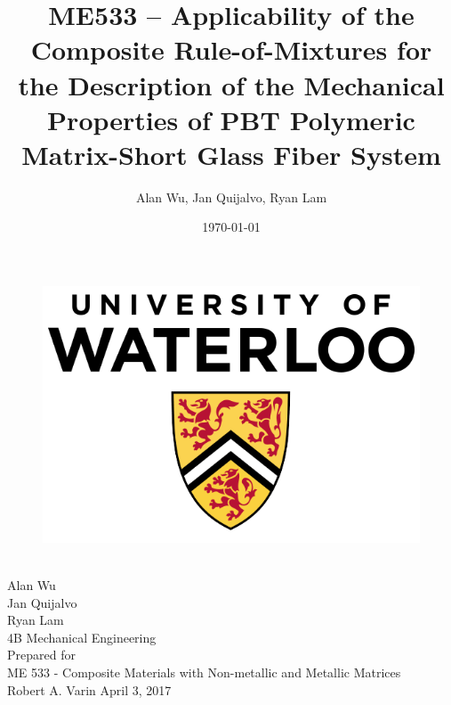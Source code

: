 \documentclass[11pt]{article}
\begin{document}
\doublespacing

\title{\textbf{ME533 -- Applicability of the Composite Rule-of-Mixtures for the Description of the Mechanical Properties of PBT Polymeric Matrix-Short Glass Fiber System}}
\author{Alan Wu, Jan Quijalvo, Ryan Lam}
\date{\today}


\makeatletter
    \singlespacing
    \begin{titlepage}
        \begin{center}
        	\begin{figure}[h]
        	\centering
            \includegraphics[scale=0.3]{./figures/University-of-Waterloo}
            \end{figure}
            \vspace{20mm}
            {\huge \bfseries  \@title }\\[2ex] 
            \vspace{5mm}
            {\LARGE Alan Wu}\\
            \vspace{2mm}
            {\LARGE Jan Quijalvo}\\
            \vspace{2mm}
            {\LARGE Ryan Lam}\\
            \vspace{2mm}
            \LARGE 4B Mechanical Engineering\\[12ex]
            Prepared for\\
            ME 533 - Composite Materials with Non-metallic and Metallic Matrices\\
            Robert A. Varin
            \centering
            \vfill
            {\large April 3, 2017}
        \end{center}
    \end{titlepage}
\makeatother
\end{document}
